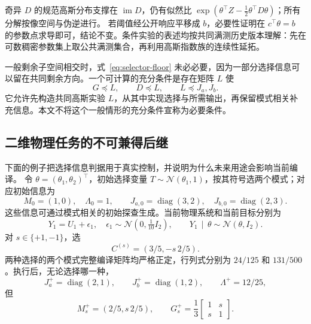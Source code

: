 \documentclass[UTF8,fontset=fandol,11pt,a4paper]{ctexart}
\newcommand{\N}{\mathcal N}
\newcommand{\im}{\operatorname{im}}
\newcommand{\diag}{\operatorname{diag}}
\newcommand{\given}{\,\mid\,}
\theoremstyle{definition}
\theoremstyle{remark}
\numberwithin{equation}{section}
\begin{document}
奇异 $D$ 的规范高斯分布支撑在 $\im D$，仍有似然比
$\exp(\theta^\top Z-\tfrac12\theta^\top D\theta)$；所有分解按像空间与伪逆进行。
若阈值经公开响应平移成 $b$，必要性证明在 $c^\top\theta=b$ 的参数点求导即可，结论不变。条件实验的表述均按共同满测历史版本理解：先在可数稠密参数集上取公共满测集合，再利用高斯指数族的连续性延拓。

一般剩余子空间相交时，式~\eqref{eq:selector-floor} 未必必要，因为一部分选择信息可以留在共同剩余方向。一个可计算的充分条件是存在矩阵 $L$ 使
\begin{equation}
 G\preceq L,\qquad D\preceq L,\qquad L\preceq J_a,J_b.
 \label{eq:common-seed-sufficient}
\end{equation}
它允许先构造共同高斯实验 $L$，从其中实现选择与所需输出，再保留模式相关补充信息。本文不将这个一般情形的充分条件宣称为必要条件。

\subsection{二维物理任务的不可兼得后继}
\label{sec:future-tradeoff}

下面的例子把选择信息判据用于真实控制，并说明为什么未来用途会影响当前编译。
令 $\theta=(\theta_1,\theta_2)^\top$，初始选择变量
$T\sim\N(\theta_1,1)$，按其符号选两个模式；对应初始信息为
\begin{equation}
 M_0=(1,0),\quad\Lambda_0=1,\qquad
 J_{a,0}=\diag(3,2),\quad J_{b,0}=\diag(2,3).
 \label{eq:tradeoff-initial}
\end{equation}
这些信息可通过模式相关的初始探查生成。当前物理系统和当前目标分别为
\begin{equation}
 Y_1=U_1+\epsilon_1,\quad\epsilon_1\sim\N(0,\tfrac1{10}I_2),
 \qquad Y_1\given\theta\sim\N(\theta,I_2).
 \label{eq:tradeoff-current}
\end{equation}
对 $s\in\{+1,-1\}$，选
\begin{equation}
 C^{(s)}=(3/5,-s\,2/5).
\end{equation}
两种选择的两个模式完整编译矩阵均严格正定，行列式分别为 $24/125$ 和 $131/500$。执行后，无论选择哪一种，
\begin{equation}
 J_a^+=\diag(2,1),\qquad J_b^+=\diag(1,2),\qquad\Lambda^+=12/25,
\end{equation}
但
\begin{equation}
 M_s^+=(2/5,s\,2/5),\qquad
 G_s^+=\frac13\begin{bmatrix}1&s\\s&1\end{bmatrix}.
 \label{eq:tradeoff-residual}
\end{equation}
\end{document}
